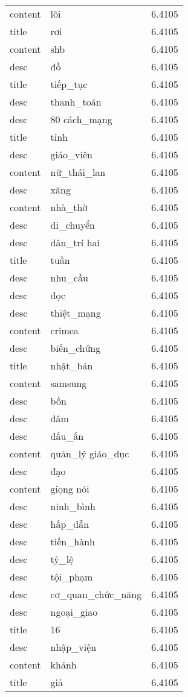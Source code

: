 \documentclass{article}
\begin{document}
\begin{tabular}{lll}
content & lôi & 6.4105\\
title & rơi & 6.4105\\
content & shb & 6.4105\\
desc & đồ & 6.4105\\
title & tiếp\_tục & 6.4105\\
desc & thanh\_toán & 6.4105\\
desc & 80 cách\_mạng & 6.4105\\
title & tỉnh & 6.4105\\
desc & giáo\_viên & 6.4105\\
content & nữ\_thái\_lan & 6.4105\\
desc & xăng & 6.4105\\
content & nhà\_thờ & 6.4105\\
desc & di\_chuyển & 6.4105\\
desc & dân\_trí hai & 6.4105\\
title & tuần & 6.4105\\
desc & nhu\_cầu & 6.4105\\
desc & đọc & 6.4105\\
desc & thiệt\_mạng & 6.4105\\
content & crimea & 6.4105\\
desc & biến\_chứng & 6.4105\\
title & nhật\_bản & 6.4105\\
content & samsung & 6.4105\\
desc & bốn & 6.4105\\
desc & đâm & 6.4105\\
desc & dấu\_ấn & 6.4105\\
content & quản\_lý giáo\_dục & 6.4105\\
desc & đạo & 6.4105\\
content & giọng nói & 6.4105\\
desc & ninh\_bình & 6.4105\\
desc & hấp\_dẫn & 6.4105\\
desc & tiến\_hành & 6.4105\\
desc & tỷ\_lệ & 6.4105\\
desc & tội\_phạm & 6.4105\\
desc & cơ\_quan\_chức\_năng & 6.4105\\
desc & ngoại\_giao & 6.4105\\
title & 16 & 6.4105\\
desc & nhập\_viện & 6.4105\\
content & khánh & 6.4105\\
title & giả & 6.4105\\

\end{tabular}
\end{document}
